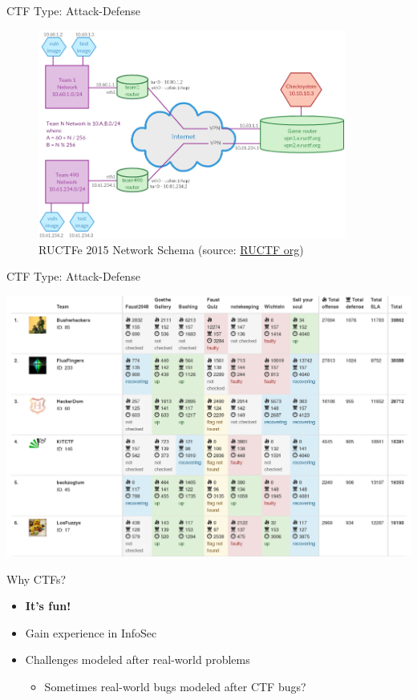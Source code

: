 \begin{frame}
  {CTF Type: Attack-Defense}

  \begin{figure}[h]
    \centering
    \includegraphics[width=0.9\textwidth]{./images/ructf-network.png}
    \caption{RUCTFe 2015 Network Schema (source:
      \href{https://ructf.org/e/2015/network.html}{RUCTF org}) }
  \end{figure}
\end{frame}
\begin{frame}
  {CTF Type: Attack-Defense}

  \begin{center}
    \includegraphics[width=\textwidth]{./images/faustctf-scoreboard.png}
  \end{center}

\end{frame}


\begin{frame}
  {Why CTFs?}

  \begin{itemize}
    \item \textbf{It's fun!}
    \item Gain experience in InfoSec
    \item Challenges modeled after real-world problems
      \begin{itemize}
        \item Sometimes real-world bugs modeled after CTF bugs?
      \end{itemize}
  \end{itemize}
\end{frame}


